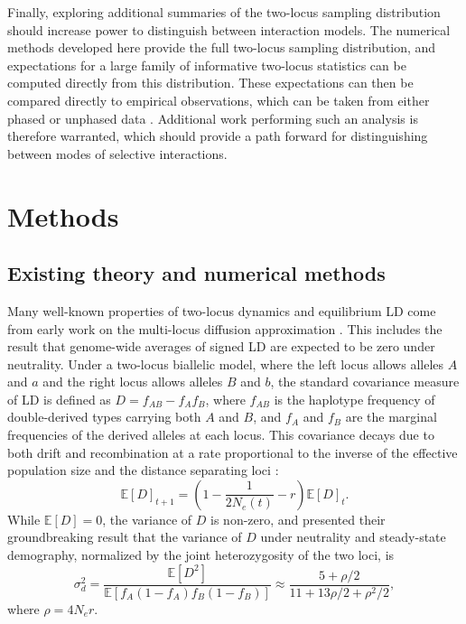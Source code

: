 \documentclass[]{article}
\newcommand{\E}{\mathbb{E}}
\begin{document}
Finally, exploring additional summaries of the two-locus sampling distribution
should increase power to distinguish between interaction models. The
numerical methods developed here provide the full two-locus sampling
distribution, and expectations for a large family of informative two-locus
statistics can be computed directly from this distribution. These expectations
can then be compared directly to empirical observations, which can be taken
from either phased or unphased data \citep{Ragsdale2020-nz}. Additional work
performing such an analysis is therefore warranted, which should provide a path
forward for distinguishing between modes of selective interactions.

\section{Methods}\label{sec:methods}

\subsection{Existing theory and numerical methods}

Many well-known properties of two-locus dynamics and equilibrium LD come from
early work on the multi-locus diffusion approximation \citep{Kimura1955-qe,
Hill1968-vu, Ohta1969-ie, Ohta1971-yd}. This includes the result that
genome-wide averages of signed LD are expected to be zero under neutrality.
Under a two-locus biallelic model, where the left locus allows alleles \(A\)
and \(a\) and the right locus allows alleles \(B\) and \(b\), the standard
covariance measure of LD is defined as \(D = f_{AB} - f_{A}f_{B}\), where
\(f_{AB}\) is the haplotype frequency of double-derived types carrying both
\(A\) and \(B\), and \(f_{A}\) and \(f_{B}\) are the marginal frequencies of
the derived alleles at each locus. This covariance decays due to both drift and
recombination at a rate proportional to the inverse of the effective population
size and the distance separating loci \citep{Hill1968-vu}:
\[\E[D]_{t+1} = \left(1 - \frac{1}{2N_e(t)} - r \right)\E[D]_t.\]
While \(\E[D] = 0\), the variance of \(D\) is non-zero, and \citet{Ohta1971-yd}
presented their groundbreaking result that the variance of \(D\) under
neutrality and steady-state demography, normalized by the joint heterozygosity
of the two loci, is
\begin{equation}
    \label{eq:ohta}
    \sigma_d^2 = \frac{\E[D^2]}{\E[f_A(1-f_A)f_B(1-f_B)]}
    \approx\frac{5 + \rho / 2}{11 + 13\rho/ 2 + \rho^2 / 2},
\end{equation}
where \(\rho = 4N_e r\).
\end{document}

